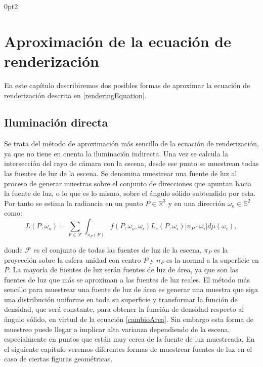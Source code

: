 \titlespacing*{\subsection}
  {0pt}{2\baselineskip}{\baselineskip}

\chapter{Aproximación de la ecuación de renderización}\label{AproximacionRE}

En este capítulo describiremos dos posibles formas de aproximar la ecuación de renderización descrita en \ref{renderingEquation}.

\section{Iluminación directa}
Se trata del método de aproximación más sencillo de la ecuación de renderización, ya que no tiene en cuenta la iluminación indirecta. Una vez se calcula la intersección del rayo de cámara con la escena, desde ese punto se muestrean todas las fuentes de luz de la escena. Se denomina muestrear una fuente de luz al proceso de generar muestras sobre el conjunto de direcciones que apuntan hacia la fuente de luz, o lo que es lo mismo, sobre el ángulo sólido subtendido por esta. Por tanto se estima la radiancia en un punto $P\in\mathds{R}^3$ y en una dirección $\omega_o\in\mathds{S}^2$ como:
$$L(P,\omega_o) = \sum_{F\in\mathscr{F}}\int_{\pi_P(F)} f(P,\omega_o, \omega_i)L_e(P,\omega_i)|n_P\cdot \omega_i|d\mu(\omega_i),$$

donde $\mathscr{F}$ es el conjunto de todas las fuentes de luz de la escena, $\pi_P$ es la proyección sobre la esfera unidad con centro $P$ y $n_P$ es la normal a la superficie en $P$. La mayoría de fuentes de luz serán fuentes de luz de área, ya que son las fuentes de luz que más se aproximan a las fuentes de luz reales. El método más sencillo para muestrear una fuente de luz de área es generar una muestra que siga una distribución uniforme en toda su superficie y transformar la función de densidad, que será constante, para obtener la función de densidad respecto al ángulo sólido, en virtud de la ecuación \ref{cambioArea}. Sin embargo esta forma de muestreo puede llegar a implicar alta varianza dependiendo de la escena, especialmente en puntos que están muy cerca de la fuente de luz muestreada. En el siguiente capítulo veremos diferentes formas de muestrear fuentes de luz en el caso de ciertas figuras geométricas.

